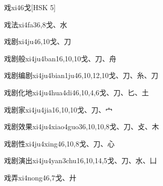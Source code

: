 \begin{entry}{戏}{xi4}{6}{⼽}[HSK 5]
\end{entry}

\begin{entry}{戏法}{xi4fa3}{6,8}{⼽、⽔}
\end{entry}

\begin{entry}{戏剧}{xi4ju4}{6,10}{⼽、⼑}
\end{entry}

\begin{entry}{戏剧般}{xi4ju4ban1}{6,10,10}{⼽、⼑、⾈}
\end{entry}

\begin{entry}{戏剧编剧}{xi4ju4bian1ju4}{6,10,12,10}{⼽、⼑、⽷、⼑}
\end{entry}

\begin{entry}{戏剧化地}{xi4ju4hua4di4}{6,10,4,6}{⼽、⼑、⼔、⼟}
\end{entry}

\begin{entry}{戏剧家}{xi4ju4jia1}{6,10,10}{⼽、⼑、⼧}
\end{entry}

\begin{entry}{戏剧效果}{xi4ju4xiao4guo3}{6,10,10,8}{⼽、⼑、⽁、⽊}
\end{entry}

\begin{entry}{戏剧性}{xi4ju4xing4}{6,10,8}{⼽、⼑、⼼}
\end{entry}

\begin{entry}{戏剧演出}{xi4ju4yan3chu1}{6,10,14,5}{⼽、⼑、⽔、⼐}
\end{entry}

\begin{entry}{戏弄}{xi4nong4}{6,7}{⼽、⼶}
\end{entry}

